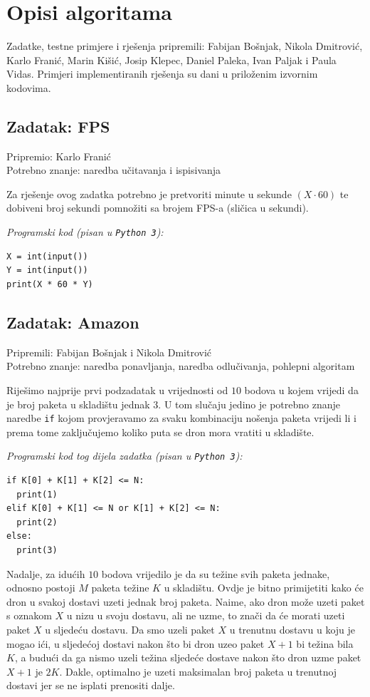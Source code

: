 \documentclass[a4paper]{article}
\begin{document}
\section*{Opisi algoritama}
Zadatke, testne primjere i rješenja pripremili: Fabijan Bošnjak, Nikola
Dmitrović, Karlo Franić, Marin Kišić, Josip Klepec, Daniel Paleka, Ivan Paljak
i Paula Vidas.  Primjeri implementiranih rješenja su dani u priloženim izvornim
kodovima.

\subsection*{Zadatak: FPS}
\textsf{Pripremio: Karlo Franić}\\
\textsf{Potrebno znanje: naredba učitavanja i ispisivanja}

Za rješenje ovog zadatka potrebno je pretvoriti minute u sekunde $(X \cdot 60)$ te
dobiveni broj sekundi pomnožiti sa brojem FPS-a (sličica u sekundi).

\textit{Programski kod (pisan u \texttt{Python 3}):}

\vspace{-2ex}
\begin{verbatim}
X = int(input())
Y = int(input())
print(X * 60 * Y)
\end{verbatim}

\subsection*{Zadatak: Amazon}
\textsf{Pripremili: Fabijan Bošnjak i Nikola Dmitrović}\\
\textsf{Potrebno znanje: naredba ponavljanja, naredba odlučivanja, pohlepni algoritam}

Riješimo najprije prvi podzadatak u vrijednosti od $10$ bodova u kojem vrijedi
da je broj paketa u skladištu jednak $3$. U tom slučaju jedino je potrebno
znanje naredbe \texttt{if} kojom provjeravamo za svaku kombinaciju nošenja
paketa vrijedi li i prema tome zaključujemo koliko puta se dron mora vratiti u
skladište.

\textit{Programski kod tog dijela zadatka (pisan u \texttt{Python 3}):}

\vspace{-2ex}
\begin{verbatim}
if K[0] + K[1] + K[2] <= N:
  print(1)
elif K[0] + K[1] <= N or K[1] + K[2] <= N:
  print(2)
else:
  print(3)
\end{verbatim}

Nadalje, za idućih $10$ bodova vrijedilo je da su težine svih paketa jednake,
odnosno postoji $M$ paketa težine $K$ u skladištu. Ovdje je bitno primijetiti
kako će dron u svakoj dostavi uzeti jednak broj paketa. Naime, ako dron može
uzeti paket s oznakom $X$ u nizu u svoju dostavu, ali ne uzme, to znači da će
morati uzeti paket $X$ u sljedeću dostavu. Da smo uzeli paket $X$ u trenutnu
dostavu u koju je mogao ići, u sljedećoj dostavi nakon što bi dron uzeo paket
$X+1$ bi težina bila $K$, a budući da ga nismo uzeli težina sljedeće dostave
nakon što dron uzme paket $X+1$ je $2K$. Dakle, optimalno je uzeti maksimalan
broj paketa u trenutnoj dostavi jer se ne isplati prenositi dalje.
\end{document}
